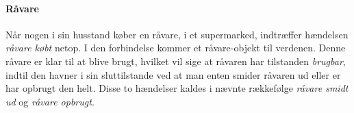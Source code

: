 \paragraph{Råvare}
Når nogen i sin husstand køber en råvare, \fx i et supermarked, indtræffer hændelsen \textit{råvare købt} netop. I den forbindelse kommer et råvare-objekt til verdenen. Denne råvare er klar til at blive brugt, hvilket vil sige at råvaren har tilstanden \textit{brugbar}, indtil den havner i sin sluttilstande ved at man enten smider råvaren ud eller er har opbrugt den helt. Disse to hændelser kaldes i nævnte rækkefølge \textit{råvare smidt ud} og \textit{råvare opbrugt}.
\begin{figure}[htp]
\centering
\scalebox{0.6}{
}
\label{fig:raavare-adfaerd}
\end{figure}